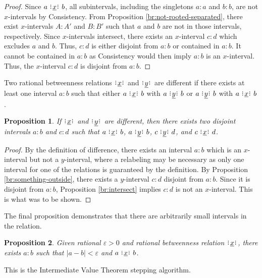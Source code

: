 \documentclass[12pt]{article}
\newtheorem{proposition}{Proposition}[section]
\begin{document}
\begin{proof}
    Since \sout{$a \xrel b$}, all subintervals, including the singletons $a:a$ and $b:b$, are not $x$-intervals by Consistency. From Proposition \ref{br:not-rooted-separated}, there exist $x$-intervals $A:A'$ and $B:B'$ such that $a$ and $b$ are not in those intervals, respectively. Since $x$-intervals intersect, there exists an $x$-interval $c:d$ which excludes $a$ and $b$. Thus, $c:d$ is either disjoint from $a:b$ or contained in $a:b$. It cannot be contained in $a:b$ as Consistency would then imply $a:b$ is an $x$-interval. Thus, the $x$-interval $c:d$ is disjoint from $a:b$.
\end{proof}


Two rational betweenness relations $\xrel$ and $\xrel[y]$ are different if there exists at least one interval $a:b$ such that either $a \xrel b$ with \sout{$a \xrel[y] b$} or $a \xrel[y] b$ with \sout{$a \xrel b$}. 

\begin{proposition}\label{br:different}
    If $\xrel$ and $\xrel[y]$ are different, then there exists two disjoint intervals $a:b$ and $c:d$ such that $a \xrel b$, \sout{$a \xrel[y] b$}, $c \xrel[y] d$, and \sout{$c \xrel d$}.
\end{proposition}


\begin{proof}
    By the definition of difference, there exists an interval $a:b$ which is an $x$-interval but not a $y$-interval, where a relabeling may be necessary as only one interval for one of the relations is guaranteed by the definition. By Proposition \ref{br:something-outside}, there exists a $y$-interval $c:d$ disjoint from $a:b$. Since it is disjoint from $a:b$, Proposition \ref{br:intersect} implies $c:d$ is not an $x$-interval. This is what was to be shown. 
\end{proof}


The final proposition demonstrates that there are arbitrarily small intervals in the relation. 

\begin{proposition}
    Given rational $\varepsilon >0$ and rational betweenness relation $\xrel$, there exists $a:b$ such that $|a-b| < \varepsilon$ and $a \xrel b$. 
\end{proposition}

This is the Intermediate Value Theorem stepping algorithm. 
\end{document}
